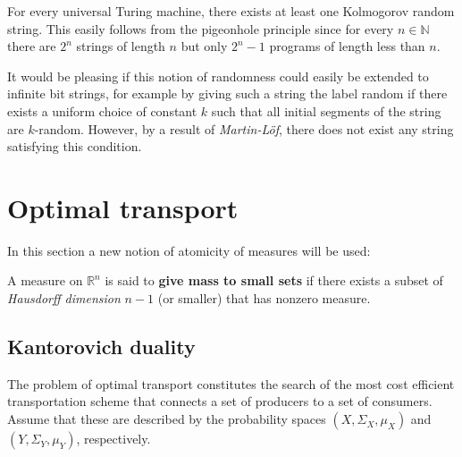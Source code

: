     \begin{property}
        For every universal Turing machine, there exists at least one Kolmogorov random string. This easily follows from the pigeonhole principle since for every $n\in\mathbb{N}$ there are $2^n$ strings of length $n$ but only $2^n-1$ programs of length less than $n$.
    \end{property}

    It would be pleasing if this notion of randomness could easily be extended to infinite bit strings, for example by giving such a string the label random if there exists a uniform choice of constant $k$ such that all initial segments of the string are $k$-random. However, by a result of \textit{Martin-L\"of}, there does not exist any string satisfying this condition.

\section{Optimal transport}\label{section:optimal_transport}

    In this section a new notion of atomicity of measures will be used:
    \begin{definition}
        A measure on $\mathbb{R}^n$ is said to \textbf{give mass to small sets} if there exists a subset of \textit{Hausdorff dimension} $n-1$ (or smaller) that has nonzero measure.
    \end{definition}

\subsection{Kantorovich duality}

    The problem of optimal transport constitutes the search of the most cost efficient transportation scheme that connects a set of producers to a set of consumers. Assume that these are described by the probability spaces $(X,\Sigma_X,\mu_X)$ and $(Y,\Sigma_Y,\mu_Y)$, respectively.


